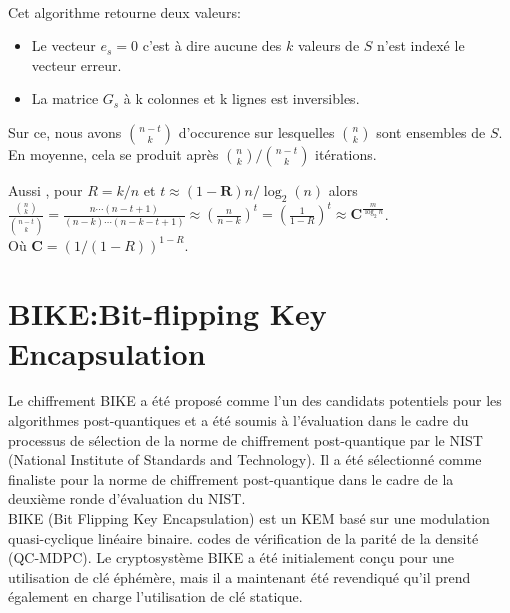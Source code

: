 \documentclass[12pt,openany]{report}
\begin{document}
\noindent\hrulefill\\
Cet algorithme retourne deux valeurs:
\begin{itemize}
\item Le vecteur  \textbf{$e_s=0$} c'est à dire  aucune des $k$ valeurs de \textbf{$S$} n'est indexé le vecteur erreur.
\item La matrice \textbf{$G_s$} à k colonnes et k lignes est inversibles.
\end{itemize}
Sur ce, nous avons $\binom{n-t}{k} $ d'occurence sur lesquelles $ \binom{n}{k}$  
sont ensembles de \textbf{$S$}.\\
En moyenne, cela se produit après $ \binom{n}{k}/ \binom{n-t}{k} $ itérations.

Aussi , pour  \textbf{$R$}$=k/n$ et $t\approx (1-\mathbf{R})n/\log_2(n) $ alors \\



$ \frac{\binom{n}{k}}{ \binom{n-t}{k} }=\frac{n\cdots (n-t+1)}{(n-k)\cdots(n-k-t+1)}\approx(\frac{n}{n-k})^t=(\frac{1}{1-R})^t\approx \mathbf{C}^{\frac{m}{\log_2n}} $.\\
Où $\mathbf{C}=(1/(1-R))^{1-R}$.




\section{BIKE:Bit-flipping Key Encapsulation }

Le chiffrement BIKE a été proposé comme l'un des candidats potentiels pour les algorithmes post-quantiques et a été soumis à l'évaluation dans le cadre du processus de sélection de la norme de chiffrement post-quantique par le NIST (National Institute of Standards and Technology). Il a été sélectionné comme finaliste pour la norme de chiffrement post-quantique dans le cadre de la deuxième ronde d'évaluation du NIST.\\
BIKE (Bit Flipping Key Encapsulation) est un KEM basé sur une modulation quasi-cyclique linéaire binaire.
codes de vérification de la parité de la densité (QC-MDPC). Le cryptosystème BIKE a été initialement conçu pour une utilisation de clé éphémère, mais il a maintenant été revendiqué qu'il prend également en charge l'utilisation de clé statique.\\
\end{document}
